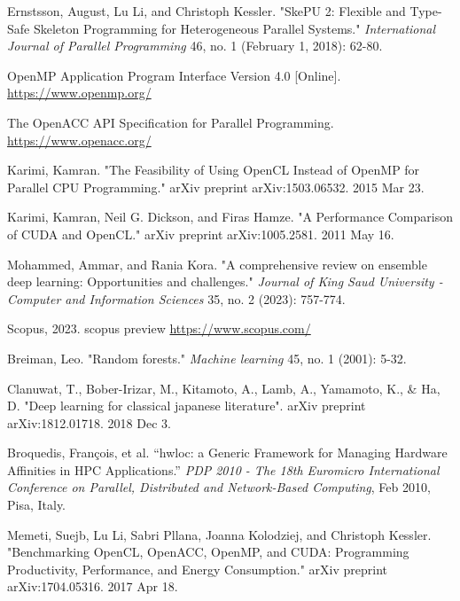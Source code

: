 \documentclass[13pt]{article}
\begin{document}
\begin{thebibliography}{9}
    Ernstsson, August, Lu Li, and Christoph Kessler.
    "SkePU 2: Flexible and Type-Safe Skeleton Programming for Heterogeneous Parallel Systems."
    \textit{International Journal of Parallel Programming} 46, no. 1 (February 1, 2018): 62-80.


    OpenMP Application Program Interface Version 4.0 [Online].
    \url{https://www.openmp.org/}


    The OpenACC API Specification for Parallel Programming.
    \url{https://www.openacc.org/}

    Karimi, Kamran.
    "The Feasibility of Using OpenCL Instead of OpenMP for Parallel CPU Programming."
    arXiv preprint arXiv:1503.06532. 2015 Mar 23.


    Karimi, Kamran, Neil G. Dickson, and Firas Hamze.
    "A Performance Comparison of CUDA and OpenCL."
    arXiv preprint arXiv:1005.2581. 2011 May 16.

    Mohammed, Ammar, and Rania Kora.
    "A comprehensive review on ensemble deep learning: Opportunities and challenges."
    \textit{Journal of King Saud University - Computer and Information Sciences} 35, no. 2 (2023): 757-774.

    Scopus, 2023. scopus preview
    \url{https://www.scopus.com/}

    Breiman, Leo.
    "Random forests."
    \textit{Machine learning} 45, no. 1 (2001): 5-32.

    Clanuwat, T., Bober-Irizar, M., Kitamoto, A., Lamb, A., Yamamoto, K., \& Ha, D.
    "Deep learning for classical japanese literature".
    arXiv preprint arXiv:1812.01718. 2018 Dec 3.

    Broquedis, François, et al. 
    ``hwloc: a Generic Framework for Managing Hardware Affinities in HPC Applications.''
    \textit{PDP 2010 - The 18th Euromicro International Conference on Parallel, Distributed and Network-Based Computing}, Feb 2010, Pisa, Italy.

    Memeti, Suejb, Lu Li, Sabri Pllana, Joanna Kolodziej, and Christoph Kessler.
    "Benchmarking OpenCL, OpenACC, OpenMP, and CUDA: Programming Productivity, Performance, and Energy Consumption."
    arXiv preprint arXiv:1704.05316. 2017 Apr 18.

    
\end{thebibliography}
\end{document}
